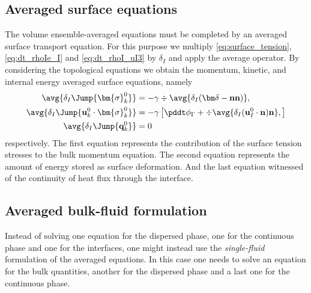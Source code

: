 \subsection{Averaged surface equations}
The volume ensemble-averaged equations must be completed by an averaged surface transport equation.  
For this purpose we multiply \ref{eq:surface_tension}, \ref{eq:dt_rhoIe_I} and \ref{eq:dt_rhoI_uI3} by $\delta_I$ and apply the average operator.
By considering the topological equations we obtain the  momentum, kinetic, and internal energy averaged surface equations, namely
\begin{align}
    \label{eq:dt_avg_uI}
    \avg{\delta_I \Jump{\bm{\sigma}^0_k}}
    &= -\gamma \div \avg{\delta_I (\bm\delta - \textbf{nn})},\\
    \label{eq:dt_avg_gamma}
    \avg{\delta_I \Jump{\textbf{u}_k^0 \cdot \bm{\sigma}^0_k}}
    &= - \gamma \left[
        \pddt \phi_\Gamma
        +  \div \avg{\delta_I (\textbf{u}_{I}^0 \cdot \textbf{n})\textbf{n} },
    \right]\\
    \avg{\delta_I \Jump{\textbf{q}^0_k}}
    &= 0
\end{align}
respectively. 
The first equation represents the contribution of the surface tension stresses to the bulk momentum equation.
The second equation represents the amount of energy stored as surface deformation.
And the last equation witnessed of the continuity of heat flux through the interface. 

\subsection{Averaged bulk-fluid formulation}
Instead of solving one equation for the dispersed phase, one for the continuous phase and one for the interfaces, one might instead use the \textit{single-fluid} formulation of the averaged equations. 
In this case one needs to solve an equation for the bulk quantities, another for the dispersed phase and a last one for the continuous phase. 


